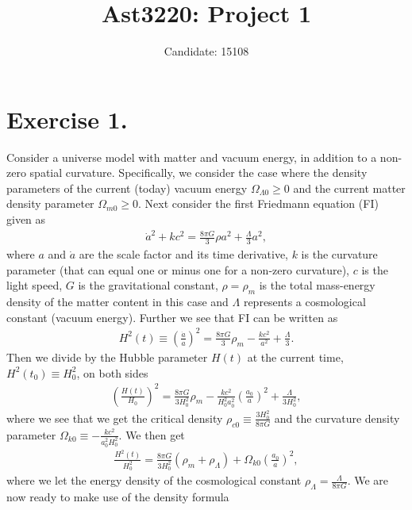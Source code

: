 \documentclass{emulateapj}
\begin{document}
	
	\title{Ast3220: Project 1}
	
	\author{Candidate: 15108}
	
	
	\section*{Exercise 1.}
	Consider a universe model with matter and vacuum energy, in addition to a non-zero spatial curvature. Specifically, we consider the case where the density parameters of the current (today) vacuum energy $\Omega_{\Lambda 0}\geq 0$ and the current matter density parameter $\Omega_{m 0}\geq 0$. Next consider the first Friedmann equation (FI) given as 
	\begin{align}
		\dot{a}^2 + kc^2 = \frac{8\pi G}{3}\rho a^2 + \frac{\Lambda}{3}a^2, 
	\end{align}
	where $a$ and $\dot{a}$ are the scale factor and its time derivative, $k$ is the curvature parameter (that can equal one or minus one for a non-zero curvature), $c$ is the light speed, $G$ is the gravitational constant, $\rho = \rho_m$ is the total mass-energy density of the matter content in this case and $\Lambda$ represents a cosmological constant (vacuum energy). Further we see that FI can be written as 
	\begin{align}
		H^2(t) \equiv \left(\frac{\dot{a}}{a}\right)^2 = \frac{8\pi G}{3}\rho_m - \frac{kc^2}{a^2} + \frac{\Lambda}{3}.
	\end{align}
	Then we divide by the Hubble parameter $H(t)$ at the current time, $H^2(t_0) \equiv H_0^2$, on both sides
	\begin{align}
		\left(\frac{H(t)}{H_0}\right)^2 = \frac{8\pi G}{3H_0^2}\rho_m - \frac{kc^2}{H_0^2 a_0^2}\left(\frac{a_0}{a}\right)^2 + \frac{\Lambda}{3H_0^2},
	\end{align}
	where we see that we get the critical density $\rho_{c0}\equiv\frac{3H_0^2}{8\pi G}$ and the curvature density parameter $\Omega_{k0} \equiv -\frac{kc^2}{a_0^2H_0^2}$. We then get
	\begin{align}
		\frac{H^2(t)}{H_0^2} = \frac{8\pi G}{3H_0^2}(\rho_m + \rho_\Lambda) + \Omega_{k0}\left(\frac{a_0}{a}\right)^2,
	\end{align}
	where we let the energy density of the cosmological constant $\rho_\Lambda = \frac{\Lambda}{8\pi G}$. We are now ready to make use of the density formula 
\end{document}
